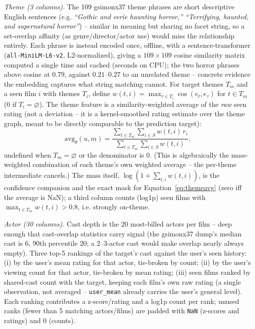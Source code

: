 \documentclass[11pt]{article}
\begin{document}
\emph{Theme (3 columns).} The 109 gsimonx37 theme phrases are short descriptive English sentences (e.g. \emph{``Gothic and eerie haunting horror,''} \emph{``Terrifying, haunted, and supernatural horror''}) -- similar in meaning but sharing no facet string, so a set-overlap affinity (as genre/director/actor use) would miss the relationship entirely. Each phrase is instead encoded once, offline, with a sentence-transformer (\texttt{all-MiniLM-L6-v2}, L2-normalized), giving a $109\times109$ cosine similarity matrix computed a single time and cached (seconds on CPU); the two horror phrases above cosine at $0.79$, against $0.21$--$0.27$ to an unrelated theme -- concrete evidence the embedding captures what string matching cannot. For target themes $T_m$ and a seen film $i$ with themes $T_i$, define $w(t,i)=\max_{\tau\in T_i}\cos(e_t,e_\tau)$ for $t\in T_m$ (0 if $T_i=\varnothing$). The theme feature is a similarity-weighted average of the \emph{raw} seen rating (not a deviation -- it is a kernel-smoothed rating estimate over the theme graph, meant to be directly comparable to the prediction target):
\begin{equation}
\mathrm{avg}_\theta(u,m)=\frac{\sum_{t\in T_m}\sum_{i\in S} w(t,i)\,r_i}{\sum_{t\in T_m}\sum_{i\in S} w(t,i)},
\label{eq:themeavg}
\end{equation}
undefined when $T_m=\varnothing$ or the denominator is 0. (This is algebraically the mass-weighted combination of each theme's own weighted average -- the per-theme intermediate cancels.) The mass itself, $\log(1+\sum_{t,i}w(t,i))$, is the confidence companion and the exact mask for Equation~\ref{eq:themeavg} (zero iff the average is NaN); a third column counts (log1p) seen films with $\max_{t\in T_m} w(t,i)>0.8$, i.e. strongly on-theme.

\emph{Actor (30 columns).} Cast depth is the 20 most-billed actors per film -- deep enough that cast-overlap statistics carry signal (the gsimonx37 dump's median cast is 6, 90th percentile 20; a 2--3-actor cast would make overlap nearly always empty). Three top-5 rankings of the target's cast against the user's seen history: (i) by the user's mean rating for that actor, tie-broken by count; (ii) by the user's viewing count for that actor, tie-broken by mean rating; (iii) seen films ranked by shared-cast count with the target, keeping each film's own raw rating (a single observation, not averaged -- \texttt{user\_mean} already carries the user's general level). Each ranking contributes a z-score/rating and a log1p count per rank; unused ranks (fewer than 5 matching actors/films) are padded with \texttt{NaN} (z-scores and ratings) and 0 (counts).
\end{document}
